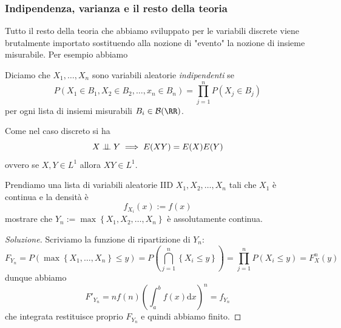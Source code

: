 \documentclass[11pt]{scrartcl}
\newcommand{\dif}{\text{d}}
\begin{document}
	\subsubsection{Indipendenza, varianza e il resto della teoria}
	Tutto il resto della teoria che abbiamo sviluppato per le variabili discrete viene brutalmente importato sostituendo alla nozione di "evento" la nozione di insieme misurabile. Per esempio abbiamo
	\begin{definition}
		Diciamo che $X_1,\dots,X_n$ sono variabili aleatorie \textit{indipendenti} se 
		$$P(X_1\in B_1,X_2\in B_2,\dots,x_n\in B_n)=\prod_{j=1}^n P(X_j\in B_j)$$
		per ogni lista di insiemi misurabili $B_i\in \mathcal{B}(\RR)$.
	\end{definition}
	Come nel caso discreto si ha
	$$X\indep Y \implies E(XY)=E(X)E(Y)$$
	ovvero se $X,Y\in L^1$ allora $XY\in L^1$.
	\begin{example}
		Prendiamo una lista di variabili aleatorie IID $X_1,X_2,\dots,X_n$ tali che $X_1$ è continua e la densità è
		$$f_{X_i}(x):=f(x)$$
		mostrare che $Y_n:=\max\left\{X_1,X_2,\dots,X_n\right\}$ è assolutamente continua.
	\end{example}
	\begin{proof}[Soluzione]
		Scriviamo la funzione di ripartizione di $Y_n$:
		$$F_{Y_n}=P(\max\left\{X_1,\dots,X_n\right\}\le y)=P\left(\bigcap_{j=1}^n \left\{X_i\le y\right\}\right)=\prod_{j=1}^n P(X_i\le y)=F_{X}^n(y)$$
		dunque abbiamo
		$$F'_{Y_n}=nf(n)\left(\int_a^b f(x)\dif x\right)^n=f_{Y_n}$$
		che integrata restituisce proprio $F_{Y_n}$ e quindi abbiamo finito.
	\end{proof}
\end{document}

